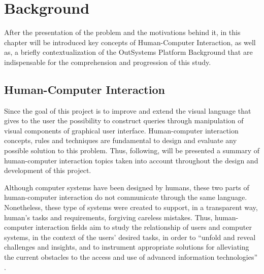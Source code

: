 \chapter{Background}
\label{cha:background}
After the presentation of the problem and the motivations behind it, in this chapter will be introduced key concepts of Human-Computer Interaction, as well as, a briefly contextualization of the OutSystems Platform Background that are indispensable for the comprehension and progression of this study.

\section{Human-Computer Interaction}
\label{sec:human_computer_interaction}
Since the goal of this project is to improve and extend the visual language that gives to the user the possibility to construct queries through manipulation of visual components of graphical user interface. Human-computer interaction concepts, rules and techniques are fundamental to design and evaluate any possible solution to this problem. Thus, following, will be presented a summary of human-computer interaction topics taken into account throughout the design and development of this project.

Although computer systems have been designed by humans, these two parts of human-computer interaction do not communicate through the same language. Nonetheless, these type of systems were created to support, in a transparent way, human’s tasks and requirements, forgiving careless mistakes. \cite{humanComputerInteraction} Thus, human-computer interaction fields aim to study the relationship of users and computer systems, in the context of the users’ desired tasks, in order to “unfold and reveal challenges and insights, and to instrument appropriate solutions for alleviating the current obstacles to the access and use of advanced information technologies” \cite{userInterfacesForAll_newPerspectivesIntoHumanComputerInteraction}. 


